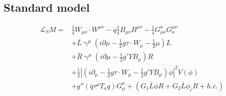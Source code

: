 \documentclass[11pt]{book}
\begin{document}
\subsection{Standard model}
\begin{equation}
\begin{split}
\mathcal{L}_SM =
&\frac{1}{4}W_{\mu\nu} \cdot W^{\mu\nu} - q\frac{1}{4}B_{\mu\nu} B^{\mu\nu}-\frac{1}{4}G^a_{\mu\nu} G^{\mu\nu}_a \\
 & + \bar{L}\upgamma^\mu(i\partial \mu - \frac{1}{2}g\tau \cdot W_\mu - \frac{1}{2}\mu)L \\
 & + \bar{R}\upgamma^\mu(i\partial \mu - \frac{1}{2}g'YB_\mu)R \\
 & + \frac{1}{2}|(i\partial_\mu - \frac{1}{2}g\tau \cdot W_\mu - \frac{1}{2}g'YB_\mu )\phi|^2 V(\phi)\\
 & + g''(\bar{q}\tau^\mu T_aq) G_\mu^a + (G_1\bar{L}\phi R + G_2\bar{L}\phi_cR + h.c.)\\
\end{split}
\end{equation}
\cite{MathBook}
\tableofcontents
\listoftables
\listoffigures

\end{document}
